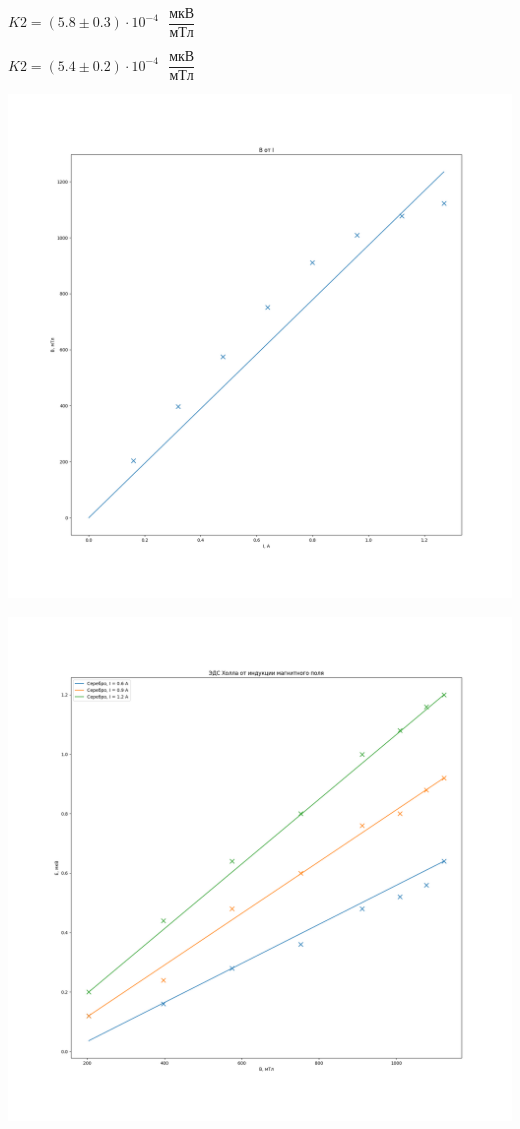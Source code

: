 \documentclass[a4paper, 12pt]{article}
\begin{document}
\begin{enumerate}
        $K2 = (5.8 \pm 0.3) \cdot 10^{-4} \text{ } \dfrac{мкВ}{мТл}$

        $K2 = (5.4 \pm 0.2) \cdot 10^{-4} \text{ } \dfrac{мкВ}{мТл}$

        \includegraphics[scale=0.3]{graph1.png}

        \includegraphics[scale=0.3]{graph2.png}


\end{enumerate}
\end{document}
